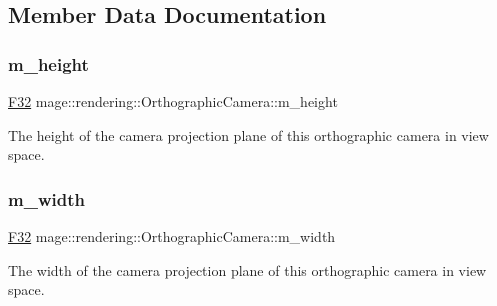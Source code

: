 \subsection{Member Data Documentation}
\hypertarget{classmage_1_1rendering_1_1_orthographic_camera_abbe1fec789e544b5de8a40546ec5db92}{}\label{classmage_1_1rendering_1_1_orthographic_camera_abbe1fec789e544b5de8a40546ec5db92} 
\subsubsection{\texorpdfstring{m\+\_\+height}{m\_height}}
{\footnotesize\ttfamily \hyperlink{namespacemage_aa97e833b45f06d60a0a9c4fc22ae02c0}{F32} mage\+::rendering\+::\+Orthographic\+Camera\+::m\+\_\+height\hspace{0.3cm}{\ttfamily [private]}}

The height of the camera projection plane of this orthographic camera in view space. \hypertarget{classmage_1_1rendering_1_1_orthographic_camera_ad4ef3a064f83f6896f59d1d36213d79b}{}\label{classmage_1_1rendering_1_1_orthographic_camera_ad4ef3a064f83f6896f59d1d36213d79b} 
\subsubsection{\texorpdfstring{m\+\_\+width}{m\_width}}
{\footnotesize\ttfamily \hyperlink{namespacemage_aa97e833b45f06d60a0a9c4fc22ae02c0}{F32} mage\+::rendering\+::\+Orthographic\+Camera\+::m\+\_\+width\hspace{0.3cm}{\ttfamily [private]}}

The width of the camera projection plane of this orthographic camera in view space. 